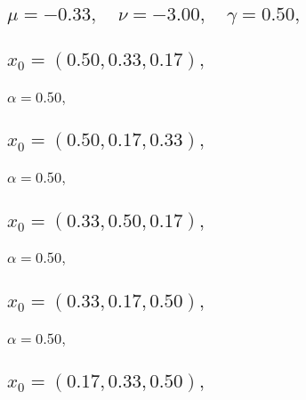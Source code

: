 \documentclass[a4paper]{article}
\begin{document}
\begin{multicols*}{2}
   \section{\(\mu = -0.33,\quad \nu = -3.00,\quad \gamma = 0.50,\quad \)}
   

   \subsection{\(x_0 = (0.50,0.33,0.17),\quad \)}
   

   \subsubsection{\(\alpha = 0.50,\quad \)}
   

   \subsection{\(x_0 = (0.50,0.17,0.33),\quad \)}
   

   \subsubsection{\(\alpha = 0.50,\quad \)}
   

   \subsection{\(x_0 = (0.33,0.50,0.17),\quad \)}
   

   \subsubsection{\(\alpha = 0.50,\quad \)}
   

   \subsection{\(x_0 = (0.33,0.17,0.50),\quad \)}
   

   \subsubsection{\(\alpha = 0.50,\quad \)}
   

   \subsection{\(x_0 = (0.17,0.33,0.50),\quad \)}
   


\end{multicols*}
\end{document}
